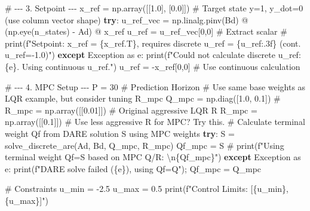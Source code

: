 \documentclass[
  letterpaper,
  DIV=11,
  numbers=noendperiod,
  oneside]{scrartcl}
\newenvironment{Shaded}{\begin{snugshade}}{\end{snugshade}}
\newcommand{\BuiltInTok}[1]{\textcolor[rgb]{0.00,0.23,0.31}{#1}}
\newcommand{\CommentTok}[1]{\textcolor[rgb]{0.37,0.37,0.37}{#1}}
\newcommand{\ControlFlowTok}[1]{\textcolor[rgb]{0.00,0.23,0.31}{\textbf{#1}}}
\newcommand{\DecValTok}[1]{\textcolor[rgb]{0.68,0.00,0.00}{#1}}
\newcommand{\FloatTok}[1]{\textcolor[rgb]{0.68,0.00,0.00}{#1}}
\newcommand{\ImportTok}[1]{\textcolor[rgb]{0.00,0.46,0.62}{#1}}
\newcommand{\NormalTok}[1]{\textcolor[rgb]{0.00,0.23,0.31}{#1}}
\newcommand{\OperatorTok}[1]{\textcolor[rgb]{0.37,0.37,0.37}{#1}}
\newcommand{\PreprocessorTok}[1]{\textcolor[rgb]{0.68,0.00,0.00}{#1}}
\newcommand{\SpecialCharTok}[1]{\textcolor[rgb]{0.37,0.37,0.37}{#1}}
\newcommand{\SpecialStringTok}[1]{\textcolor[rgb]{0.13,0.47,0.30}{#1}}
\begin{document}
\begin{Shaded}
\begin{Highlighting}[numbers=left,,]
\CommentTok{\# {-}{-}{-} 3. Setpoint {-}{-}{-}}
\NormalTok{x\_ref }\OperatorTok{=}\NormalTok{ np.array([[}\FloatTok{1.0}\NormalTok{], [}\FloatTok{0.0}\NormalTok{]]) }\CommentTok{\# Target state y=1, y\_dot=0 (use column vector shape)}
\ControlFlowTok{try}\NormalTok{:}
\NormalTok{    u\_ref\_vec }\OperatorTok{=}\NormalTok{ np.linalg.pinv(Bd) }\OperatorTok{@}\NormalTok{ (np.eye(n\_states) }\OperatorTok{{-}}\NormalTok{ Ad) }\OperatorTok{@}\NormalTok{ x\_ref}
\NormalTok{    u\_ref }\OperatorTok{=}\NormalTok{ u\_ref\_vec[}\DecValTok{0}\NormalTok{,}\DecValTok{0}\NormalTok{] }\CommentTok{\# Extract scalar}
    \CommentTok{\# print(f"Setpoint: x\_ref = \{x\_ref.T\}, requires discrete u\_ref = \{u\_ref:.3f\} (cont. u\_ref={-}1.0)")}
\ControlFlowTok{except} \PreprocessorTok{Exception} \ImportTok{as}\NormalTok{ e:}
    \BuiltInTok{print}\NormalTok{(}\SpecialStringTok{f"Could not calculate discrete u\_ref: }\SpecialCharTok{\{}\NormalTok{e}\SpecialCharTok{\}}\SpecialStringTok{. Using continuous u\_ref."}\NormalTok{)}
\NormalTok{    u\_ref }\OperatorTok{=} \OperatorTok{{-}}\NormalTok{x\_ref[}\DecValTok{0}\NormalTok{,}\DecValTok{0}\NormalTok{] }\CommentTok{\# Use continuous calculation}

\CommentTok{\# {-}{-}{-} 4. MPC Setup {-}{-}{-}}
\NormalTok{P }\OperatorTok{=} \DecValTok{30} \CommentTok{\# Prediction Horizon}
\CommentTok{\# Use same base weights as LQR example, but consider tuning R\_mpc}
\NormalTok{Q\_mpc }\OperatorTok{=}\NormalTok{ np.diag([}\FloatTok{1.0}\NormalTok{, }\FloatTok{0.1}\NormalTok{])}
\CommentTok{\# R\_mpc = np.array([[0.01]]) \# Original aggressive LQR R}
\NormalTok{R\_mpc }\OperatorTok{=}\NormalTok{ np.array([[}\FloatTok{0.1}\NormalTok{]]) }\CommentTok{\# Use less aggressive R for MPC? Try this.}
\CommentTok{\# Calculate terminal weight Qf from DARE solution S using MPC weights}
\ControlFlowTok{try}\NormalTok{:}
\NormalTok{    S }\OperatorTok{=}\NormalTok{ solve\_discrete\_are(Ad, Bd, Q\_mpc, R\_mpc)}
\NormalTok{    Qf\_mpc }\OperatorTok{=}\NormalTok{ S}
    \CommentTok{\# print(f"Using terminal weight Qf=S based on MPC Q/R: \textbackslash{}n\{Qf\_mpc\}")}
\ControlFlowTok{except} \PreprocessorTok{Exception} \ImportTok{as}\NormalTok{ e:}
    \BuiltInTok{print}\NormalTok{(}\SpecialStringTok{f"DARE solve failed (}\SpecialCharTok{\{}\NormalTok{e}\SpecialCharTok{\}}\SpecialStringTok{), using Qf=Q"}\NormalTok{)}\OperatorTok{;}\NormalTok{ Qf\_mpc }\OperatorTok{=}\NormalTok{ Q\_mpc}

\CommentTok{\# Constraints}
\NormalTok{u\_min }\OperatorTok{=} \OperatorTok{{-}}\FloatTok{2.5}
\NormalTok{u\_max }\OperatorTok{=} \FloatTok{0.5}
\BuiltInTok{print}\NormalTok{(}\SpecialStringTok{f"Control Limits: [}\SpecialCharTok{\{}\NormalTok{u\_min}\SpecialCharTok{\}}\SpecialStringTok{, }\SpecialCharTok{\{}\NormalTok{u\_max}\SpecialCharTok{\}}\SpecialStringTok{]"}\NormalTok{)}


\end{Highlighting}
\end{Shaded}
\end{document}
